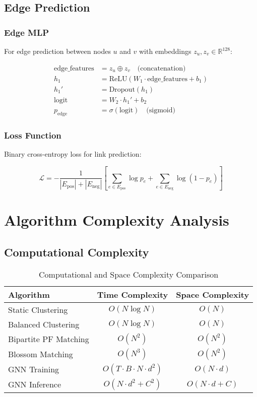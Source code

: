 \documentclass[11pt,a4paper]{article}
\begin{document}
\subsection{Edge Prediction}

\subsubsection{Edge MLP}

For edge prediction between nodes $u$ and $v$ with embeddings $z_u, z_v \in \mathbb{R}^{128}$:

\begin{align}
\text{edge\_features} &= z_u \oplus z_v \quad \text{(concatenation)} \\
h_1 &= \text{ReLU}(W_1 \cdot \text{edge\_features} + b_1) \\
h_1' &= \text{Dropout}(h_1) \\
\text{logit} &= W_2 \cdot h_1' + b_2 \\
p_{\text{edge}} &= \sigma(\text{logit}) \quad \text{(sigmoid)}
\end{align}

\subsubsection{Loss Function}

Binary cross-entropy loss for link prediction:

\begin{equation}
\mathcal{L} = -\frac{1}{|E_{\text{pos}}| + |E_{\text{neg}}|} \left[ \sum_{e \in E_{\text{pos}}} \log p_e + \sum_{e \in E_{\text{neg}}} \log(1 - p_e) \right]
\end{equation}

\section{Algorithm Complexity Analysis}

\subsection{Computational Complexity}

\begin{table}[H]
\centering
\begin{tabular}{@{}lcc@{}}
\toprule
\textbf{Algorithm} & \textbf{Time Complexity} & \textbf{Space Complexity} \\
\midrule
Static Clustering & $O(N \log N)$ & $O(N)$ \\
Balanced Clustering & $O(N \log N)$ & $O(N)$ \\
Bipartite PF Matching & $O(N^2)$ & $O(N^2)$ \\
Blossom Matching & $O(N^3)$ & $O(N^2)$ \\
GNN Training & $O(T \cdot B \cdot N \cdot d^2)$ & $O(N \cdot d)$ \\
GNN Inference & $O(N \cdot d^2 + C^2)$ & $O(N \cdot d + C)$ \\
\bottomrule
\end{tabular}
\caption{Computational and Space Complexity Comparison}
\label{tab:complexity_analysis}
\end{table}
\end{document}
